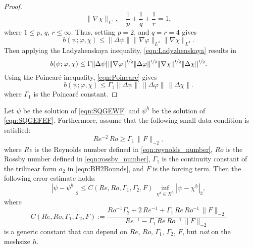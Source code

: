 \begin{proof}
\begin{equation}
      \|\nabla \chi\|_{L^r},\quad \frac{1}{p}+\frac{1}{q}+\frac{1}{r}=1,
    \label{eqn:HolderB}
  \end{equation}
  where $1\le p,\,q,\,r\le \infty$. Thus, setting $p = 2$, and $q = r = 4$ gives
  \begin{equation*}
    b(\psi;\varphi,\chi) \le \|\Delta \psi\| \|\nabla \varphi\|_{L^4} \|\nabla
      \chi\|_{L^4}.
  \end{equation*}
  Then applying the Ladyzhenskaya inequality, \eqref{eqn:Ladyzhenskaya} results in
  \begin{equation*}
    b(\psi;\varphi,\chi) \le \Gamma \|\Delta \psi\|
      \|\nabla \varphi\|^{\nicefrac{1}{2}} \|\Delta \varphi\|^{\nicefrac{1}{2}}
      \|\nabla \chi\|^{\nicefrac{1}{2}} \|\Delta \chi\|^{\nicefrac{1}{2}}.
  \end{equation*}
  Using the Poincar\'e inequality, \eqref{eqn:Poincare} gives
  \begin{equation*}
    b(\psi;\varphi,\chi) \le \Gamma_1 \|\Delta \psi\|\, \|\Delta \varphi\|\,
      \|\Delta \chi\|.
  \end{equation*}
  where $\Gamma_1$ is the Poincar\'e constant.
\end{proof}

\begin{thm}
\label{thm:EnergyNorm}
  Let $\psi$ be the solution of \eqref{eqn:SQGEWF} and $\psi^h$ be the solution
  of \eqref{eqn:SQGEFEF}.
  Furthermore, assume that the following small data condition is satisfied:
  \begin{equation}
    Re^{-2} \, Ro \geq \Gamma_1 \, \| F \|_{-2} ,
    \label{eqn:small_data_condition}
  \end{equation}
  where $Re$ is the Reynolds number defined in \eqref{eqn:reynolds_number}, $Ro$
  is the Rossby number defined in \eqref{eqn:rossby_number}, $\Gamma_1$ is the
  continuity constant of the trilinear form $a_2$ in \eqref{eqn:BH2Bounds}, and $F$
  is the forcing term. Then the following error estimate holds:
  \begin{equation}
    |\psi - \psi^h|_2 \le C(Re, Ro, \Gamma_1, \Gamma_2, F) \,
      \inf_{\chi^h \in X^h} |\psi - \chi^h|_2 ,
    \label{eqn:EnergyNorm}
  \end{equation}
  where
  \begin{equation}
    C(Re, Ro, \Gamma_1, \Gamma_2, F)
      := \frac{ Ro^{-1} \Gamma_2 + 2 \, Re^{-1} + \Gamma_1 \, Re \, Ro^{-1} \,
        \| F \|_{-2} }
        { Re^{-1} - \Gamma_1 \, Re \, Ro^{-1} \, \| F \|_{-2} }
    \label{eqn:constant_definition}
  \end{equation}
  is a generic constant that can depend on $Re$, $Ro$, $\Gamma_1$, $\Gamma_2$, $F$, but
  \emph{not} on the meshsize $h$.
\end{thm}

